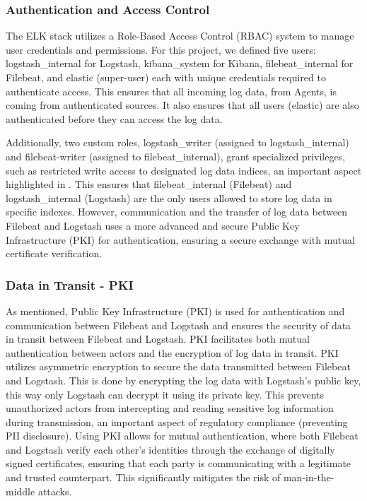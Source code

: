 \documentclass[final,1p,times,authoryear]{elsarticle}
\begin{document}
\subsubsection{Authentication and Access Control}
\label{sub3sub5sec1}
The ELK stack utilizes a Role-Based Access Control (RBAC) system to manage user credentials and permissions. For this project, we defined five users: logstash\_internal for Logstash, kibana\_system for Kibana, filebeat\_internal for Filebeat, and elastic (super-user) each with unique credentials required to authenticate access. This ensures that all incoming log data, from Agents, is coming from authenticated sources. It also ensures that all users (elastic) are also authenticated before they can access the log data.

\vspace{1em}

Additionally, two custom roles, logstash\_writer (assigned to logstash\_internal) and filebeat-writer (assigned to filebeat\_internal), grant specialized privileges, such as restricted write access to designated log data indices, an important aspect highlighted in \citep{tan2001forensic}. This ensures that filebeat\_internal (Filebeat) and logstash\_internal (Logstash) are the only users allowed to store log data in specific indexes. However, communication and the transfer of log data between Filebeat and Logstash uses a more advanced and secure Public Key Infrastructure (PKI) \citep{boldyreva2007closer} for authentication, ensuring a secure exchange with mutual certificate verification.

\subsubsection{Data in Transit - PKI}
\label{sub3sub5sec2}
As mentioned, Public Key Infrastructure (PKI) is used for authentication and communication between Filebeat and Logstash and ensures the security of data in transit between Filebeat and Logstash. PKI facilitates both mutual authentication between actors and the encryption of log data in transit. PKI utilizes asymmetric encryption to secure the data transmitted between Filebeat and Logstash. This is done by encrypting the log data with Logstash's public key, this way only Logstash can decrypt it using its private key. This prevents unauthorized actors from intercepting and reading sensitive log information during transmission, an important aspect of regulatory compliance (preventing PII disclosure). Using PKI allows for mutual authentication, where both Filebeat and Logstash verify each other's identities through the exchange of digitally signed certificates, ensuring that each party is communicating with a legitimate and trusted counterpart. This significantly mitigates the risk of man-in-the-middle attacks.
\end{document}
